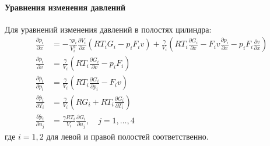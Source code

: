 \paragraph{Уравнения изменения давлений}
Для уравнений изменения давлений в полостях цилиндра:
\begin{equation}
\label{eq:ch2/jacobian_pressure}
    \begin{aligned}
        \frac{\partial \dot{p_i}}{\partial x}   & = -\frac{\gamma p_i}{V_i^2}\frac{\partial V_i}{\partial x}(RT_iG_i - p_iF_iv) + \frac{\gamma}{V_i}\left(RT_i\frac{\partial G_i}{\partial x} - F_iv\frac{\partial p_i}{\partial x} - p_iF_i\frac{\partial v}{\partial x}\right) \\
        \frac{\partial \dot{p_i}}{\partial v}   & = \frac{\gamma}{V_i}\left(RT_i\frac{\partial G_i}{\partial v} - p_iF_i\right)                                                                                                                                                  \\
        \frac{\partial \dot{p_i}}{\partial p_i} & = \frac{\gamma}{V_i}\left(RT_i\frac{\partial G_i}{\partial p_i} - F_iv\right)                                                                                                                                                  \\
        \frac{\partial \dot{p_i}}{\partial T_i} & = \frac{\gamma}{V_i}\left(RG_i + RT_i\frac{\partial G_i}{\partial T_i}\right)                                                                                                                                                  \\
        \frac{\partial \dot{p_i}}{\partial u_j} & = \frac{\gamma RT_i}{V_i}\frac{\partial G_i}{\partial u_j}, \quad j = 1, \ldots, 4
    \end{aligned}
\end{equation}
где $i = 1, 2$ для левой и правой полостей соответственно.

